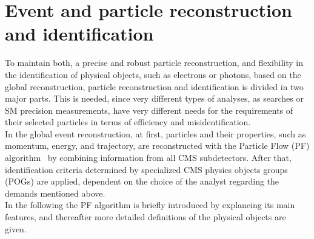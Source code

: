 \section{Event and particle reconstruction and identification}\label{sec:reco}
To maintain both, a precise and robust particle reconstruction, and flexibility in the identification of physical objects, such as electrons or photons, based on the global reconstruction, particle reconstruction and identification is divided in two major parts. This is needed, since very different types of analyses, as searches or SM precision measurements, have very different needs for the requirements of their selected particles in terms of efficiency and misidentification.\\
In the global event reconstruction, at first, particles and their properties, such as momentum, energy, and trajectory, are reconstructed with the Particle Flow (PF) algorithm~\cite{ParticleFlow} by combining information from all CMS subdetectors. After that, identification criteria determined by specialized CMS physics objects groups (POGs) are applied, dependent on the choice of the analyst regarding the demands mentioned above.\\
In the following the PF algorithm is briefly introduced by explaneing its main features, and thereafter more detailed definitions of the physical objects are given.

